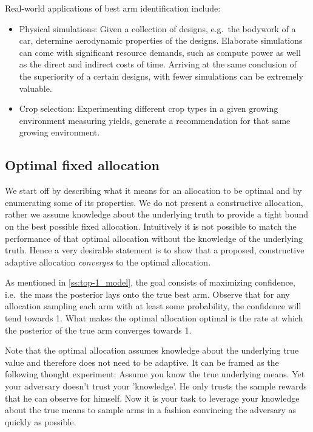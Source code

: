 Real-world applications of best arm identification include:
\begin{itemize}
  \item Physical simulations: Given a collection of designs, e.g.\ the bodywork
  of a car, determine aerodynamic properties of the designs. Elaborate
  simulations can come with significant resource demands, such as compute power
  as well as the direct and indirect costs of time. Arriving at the same
  conclusion of the superiority of a certain designs, with fewer simulations can
  be extremely valuable.
  \item Crop selection: Experimenting different crop types in a given growing
  environment measuring yields, generate a recommendation for that same growing
  environment.
\end{itemize}


\subsection{Optimal fixed allocation}\label{subsection:optimal_allocation}

We start off by describing what it means for an allocation to be optimal and by
enumerating some of its properties. We do not present a constructive allocation,
rather we assume knowledge about the underlying truth to provide a tight bound
on the best possible fixed allocation. Intuitively it is not possible to match
the performance of that optimal allocation without the knowledge of the
underlying truth. Hence a very desirable statement is to show that a proposed,
constructive adaptive allocation \emph{converges} to the optimal allocation.

As mentioned in \ref{ss:top-1_model}, the goal consists of maximizing
confidence, i.e.\ the mass the posterior lays onto the true best arm. Observe
that for any allocation sampling each arm with at least some probability, the
confidence will tend towards 1. What makes the optimal allocation optimal is the
rate at which the posterior of the true arm converges towards 1.

Note that the optimal allocation assumes knowledge about the underlying true
value and therefore does not need to be adaptive. It can be framed as the
following thought experiment: Assume you know the true underlying means. Yet
your adversary doesn't trust your 'knowledge'. He only trusts the sample rewards
that he can observe for himself. Now it is your task to leverage your knowledge
about the true means to sample arms in a fashion convincing the adversary as
quickly as possible.

